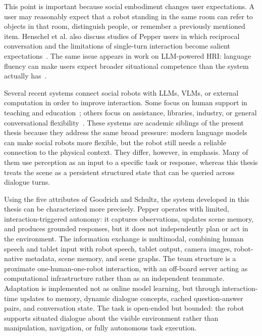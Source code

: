   This point is important because social embodiment changes user expectations. A user may reasonably expect that a robot standing in the same room can refer to objects in that room, distinguish people,
  or remember a previously mentioned item. Henschel et al. also discuss studies of Pepper users in which reciprocal conversation and the limitations of single-turn interaction become salient
  expectations~\cite[12]{henschel_what_2021}. The same issue appears in work on LLM-powered HRI: language fluency can make users expect broader situational competence than the system actually
  has~\cite{kim_understanding_2024,atuhurra_leveraging_2024}.

  Several recent systems connect social robots with LLMs, VLMs, or external computation in order to improve interaction. Some focus on human support in teaching and
  education~\cite{latif_physicsassistant_2024,sievers_humanoid_2025}; others focus on assistance, libraries, industry, or general conversational flexibility~\cite{trinquet_future_2025,brad_retrieval-
  augmented_2025,becerra_improving_2024}. These systems are academic siblings of the present thesis because they address the same broad pressure: modern language models can make social robots more
  flexible, but the robot still needs a reliable connection to the physical context. They differ, however, in emphasis. Many of them use perception as an input to a specific task or response, whereas
  this thesis treats the scene as a persistent structured state that can be queried across dialogue turns.

  Using the five attributes of Goodrich and Schultz, the system developed in this thesis can be characterized more precisely. Pepper operates with limited, interaction-triggered autonomy: it captures
  observations, updates scene memory, and produces grounded responses, but it does not independently plan or act in the environment. The information exchange is multimodal, combining human speech and
  tablet input with robot speech, tablet output, camera images, robot-native metadata, scene memory, and scene graphs. The team structure is a proximate one-human-one-robot interaction, with an off-board
  server acting as computational infrastructure rather than as an independent teammate. Adaptation is implemented not as online model learning, but through interaction-time updates to memory, dynamic
  dialogue concepts, cached question-answer pairs, and conversation state. The task is open-ended but bounded: the robot supports situated dialogue about the visible environment rather than manipulation,
  navigation, or fully autonomous task execution.

